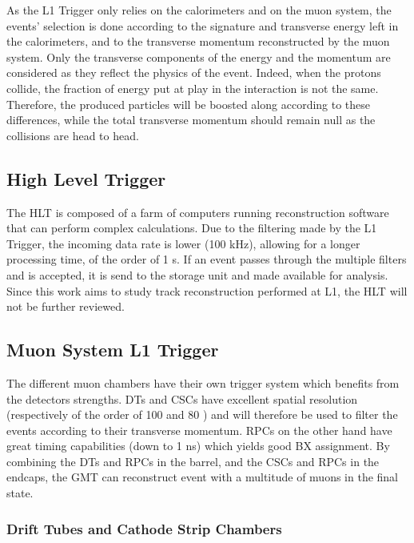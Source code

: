     			As the L1 Trigger only relies on the calorimeters and on the muon system, the events' selection is done according to the signature and transverse energy left in the calorimeters, and to the transverse momentum reconstructed by the muon system. Only the transverse components of the energy and the momentum are considered as they reflect the physics of the event. Indeed, when the protons collide, the fraction of energy put at play in the interaction is not the same. Therefore, the produced particles will be boosted along  according to these differences, while the total transverse momentum should remain null as the collisions are head to head.

    		\subsection{High Level Trigger}
    		\label{sec:trigger_system_and_reconstruction_algorithms__high_level_trigger}

    			The HLT is composed of a farm of computers running reconstruction software that can perform complex calculations. Due to the filtering made by the L1 Trigger, the incoming data rate is lower (100 kHz), allowing for a longer processing time, of the order of 1 s. If an event passes through the multiple filters and is accepted, it is send to the storage unit and made available for analysis. Since this work aims to study track reconstruction performed at L1, the HLT will not be further reviewed.

    		\subsection{Muon System L1 Trigger}
    		\label{sec:trigger_system_and_reconstruction_algorithms__muon_system_l1_trigger}

    			The different muon chambers have their own trigger system which benefits from the detectors strengths. DTs and CSCs have excellent spatial resolution (respectively of the order of 100 and 80 \um{}) and will therefore be used to filter the events according to their transverse momentum. RPCs on the other hand have great timing capabilities (down to 1 ns) which yields good BX assignment. By combining the DTs and RPCs in the barrel, and the CSCs and RPCs in the endcaps, the GMT can reconstruct event with a multitude of muons in the final state.

    			\subsubsection{Drift Tubes and Cathode Strip Chambers}
    			\label{sec:trigger_system_and_reconstruction_algorithms__dt_and_csc}

